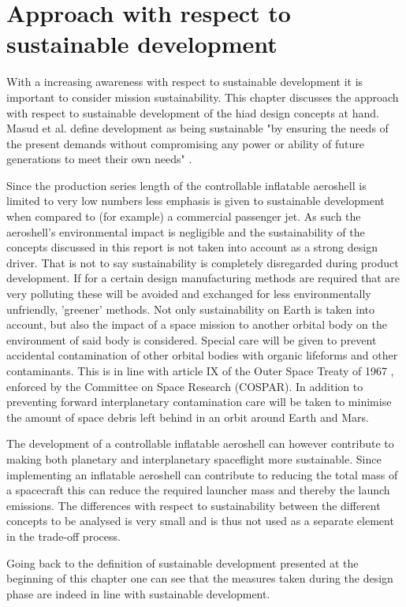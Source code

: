 \section{Approach with respect to sustainable development}
\label{ch:sustain}

With a increasing awareness with respect to sustainable development it is important to consider mission sustainability. This chapter discusses the approach with respect to sustainable development of the \gls{hiad} design concepts at hand. Masud et al. define development as being sustainable "by ensuring the needs of the present demands without compromising any power or ability of future generations to meet their own needs" \cite{Masud2011}.

Since the production series length of the controllable inflatable aeroshell is limited to very low numbers less emphasis is given to sustainable development when compared to (for example) a commercial passenger jet. As such the aeroshell's environmental impact is negligible and the sustainability of the concepts discussed in this report is not taken into account as a strong design driver. That is not to say sustainability is completely disregarded during product development. If for a certain design manufacturing methods are required that are very polluting these will be avoided and exchanged for less environmentally unfriendly, 'greener' methods. 
Not only sustainability on Earth is taken into account, but also the impact of a space mission to another orbital body on the environment of said body is considered. Special care will be given to prevent accidental contamination of other orbital bodies with organic lifeforms and other contaminants. This is in line with article IX of the Outer Space Treaty of 1967 \cite{UnitedNations2008}, enforced by the Committee on Space Research (COSPAR). In addition to preventing forward interplanetary contamination care will be taken to minimise the amount of space debris left behind in an orbit around Earth and Mars. 

The development of a controllable inflatable aeroshell can however contribute to making both planetary and interplanetary spaceflight more sustainable. Since implementing an inflatable aeroshell can contribute to reducing the total mass of a spacecraft this can reduce the required launcher mass and thereby the launch emissions. The differences with respect to sustainability between the different concepts to be analysed is very small and is thus not used as a separate element in the trade-off process.

Going back to the definition of sustainable development presented at the beginning of this chapter one can see that the measures taken during the design phase are indeed in line with sustainable development.